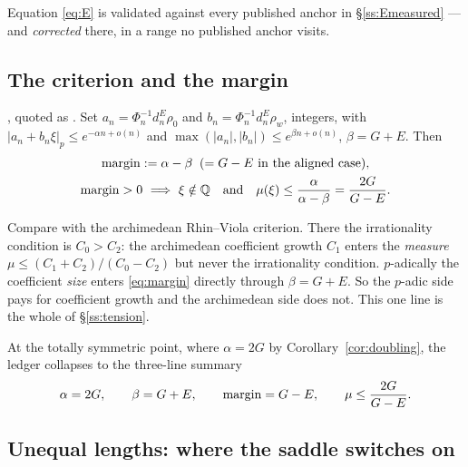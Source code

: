 Equation \eqref{eq:E} is validated against every published anchor in
\S\ref{ss:Emeasured} --- and \emph{corrected} there, in a range no published anchor visits.

\subsection{The criterion and the margin}\label{ss:criterion}

\begin{proposition}\label{prop:bel}
\PROVED{} \cite[Lemme 3.2]{Bel2019}, quoted as \cite[Lemma 4]{LSZ2025}. Set
$a_n=\Phi_n^{-1}d_n^E\rho_0$ and $b_n=\Phi_n^{-1}d_n^E\rho_w$, integers, with
$|a_n+b_n\xi|_p\le e^{-\alpha n+o(n)}$ and $\max(|a_n|,|b_n|)\le e^{\beta n+o(n)}$,
$\beta=G+E$. Then
\begin{equation}\label{eq:margin}
\begin{gathered}
 \operatorname{margin}:=\alpha-\beta \;\;(=G-E\ \text{in the aligned case}),\\
 \operatorname{margin}>0\ \Longrightarrow\ \xi\notin\mathbb{Q}\quad\text{and}\quad
 \mu(\xi)\le\frac{\alpha}{\alpha-\beta}=\frac{2G}{G-E}.
\end{gathered}
\end{equation}
\end{proposition}

\begin{remark}\label{rem:asymmetry}
Compare with the archimedean Rhin--Viola criterion. There the irrationality condition is
$C_0>C_2$: the archimedean coefficient growth $C_1$ enters the \emph{measure}
$\mu\le(C_1+C_2)/(C_0-C_2)$ but never the irrationality condition. $p$-adically the
coefficient \emph{size} enters \eqref{eq:margin} directly through $\beta=G+E$. So the
$p$-adic side pays for coefficient growth and the archimedean side does not. This one line
is the whole of \S\ref{ss:tension}.
\end{remark}

At the totally symmetric point, where $\alpha=2G$ by Corollary~\ref{cor:doubling}, the
ledger collapses to the three-line summary
\begin{equation}\label{eq:ledgersummary}
 \alpha=2G,\qquad \beta=G+E,\qquad \operatorname{margin}=G-E,\qquad \mu\le\frac{2G}{G-E}.
\end{equation}

\subsection{Unequal lengths: where the saddle switches on}\label{ss:unequal}

